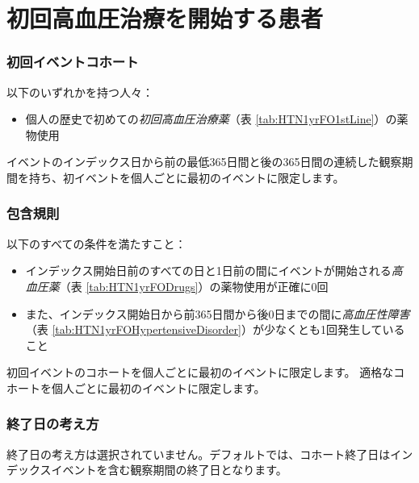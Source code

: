 \documentclass[
  11pt]{book}
\providecommand{\tightlist}{%
  \setlength{\itemsep}{0pt}\setlength{\parskip}{0pt}}
\theoremstyle{definition}
\theoremstyle{definition}
\theoremstyle{definition}
\theoremstyle{definition}
\theoremstyle{remark}
\begin{document}
\section{初回高血圧治療を開始する患者}\label{HTN1yrFO}

\subsubsection*{初回イベントコホート}\label{ux521dux56deux30a4ux30d9ux30f3ux30c8ux30b3ux30dbux30fcux30c8}

以下のいずれかを持つ人々：

\begin{itemize}
\tightlist
\item
  個人の歴史で初めての\emph{初回高血圧治療薬}（表 \ref{tab:HTN1yrFO1stLine}）の薬物使用
\end{itemize}

イベントのインデックス日から前の最低365日間と後の365日間の連続した観察期間を持ち、初イベントを個人ごとに最初のイベントに限定します。

\subsubsection*{包含規則}\label{ux5305ux542bux898fux5247-1}

以下のすべての条件を満たすこと：

\begin{itemize}
\tightlist
\item
  インデックス開始日前のすべての日と1日前の間にイベントが開始される\emph{高血圧薬}（表 \ref{tab:HTN1yrFODrugs}）の薬物使用が正確に0回
\item
  また、インデックス開始日から前365日間から後0日までの間に\emph{高血圧性障害}（表 \ref{tab:HTN1yrFOHypertensiveDisorder}）が少なくとも1回発生していること
\end{itemize}

初回イベントのコホートを個人ごとに最初のイベントに限定します。
適格なコホートを個人ごとに最初のイベントに限定します。

\subsubsection*{終了日の考え方}\label{ux7d42ux4e86ux65e5ux306eux8003ux3048ux65b9-3}

終了日の考え方は選択されていません。デフォルトでは、コホート終了日はインデックスイベントを含む観察期間の終了日となります。
\end{document}
